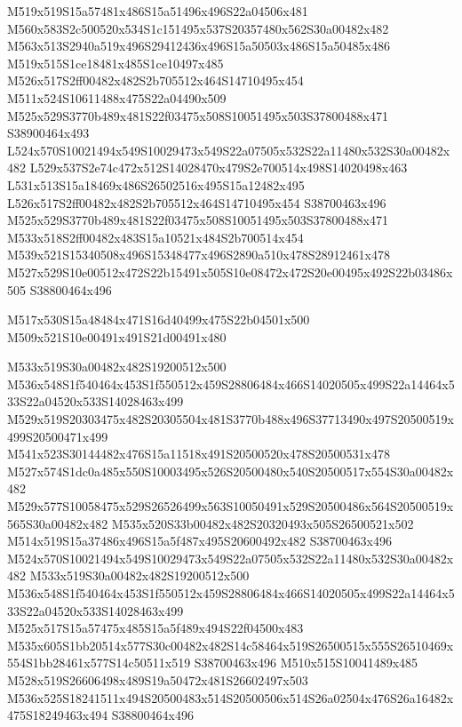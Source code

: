 \documentclass{article}
\begin{document}
\begin{multicols}{2}
M519x519S15a57481x486S15a51496x496S22a04506x481 M560x583S2c500520x534S1c151495x537S20357480x562S30a00482x482 M563x513S2940a519x496S29412436x496S15a50503x486S15a50485x486 M519x515S1ce18481x485S1ce10497x485 M526x517S2ff00482x482S2b705512x464S14710495x454 M511x524S10611488x475S22a04490x509 M525x529S3770b489x481S22f03475x508S10051495x503S37800488x471 S38900464x493 L524x570S10021494x549S10029473x549S22a07505x532S22a11480x532S30a00482x482 L529x537S2e74c472x512S14028470x479S2e700514x498S14020498x463 L531x513S15a18469x486S26502516x495S15a12482x495 L526x517S2ff00482x482S2b705512x464S14710495x454 S38700463x496 M525x529S3770b489x481S22f03475x508S10051495x503S37800488x471 M533x518S2ff00482x483S15a10521x484S2b700514x454 M539x521S15340508x496S15348477x496S2890a510x478S28912461x478 M527x529S10e00512x472S22b15491x505S10e08472x472S20e00495x492S22b03486x505 S38800464x496

\begin{center}
M517x530S15a48484x471S16d40499x475S22b04501x500 M509x521S10e00491x491S21d00491x480 
\end{center}


M533x519S30a00482x482S19200512x500 M536x548S1f540464x453S1f550512x459S28806484x466S14020505x499S22a14464x533S22a04520x533S14028463x499 M529x519S20303475x482S20305504x481S3770b488x496S37713490x497S20500519x499S20500471x499 M541x523S30144482x476S15a11518x491S20500520x478S20500531x478 M527x574S1dc0a485x550S10003495x526S20500480x540S20500517x554S30a00482x482 M529x577S10058475x529S26526499x563S10050491x529S20500486x564S20500519x565S30a00482x482 M535x520S33b00482x482S20320493x505S26500521x502 M514x519S15a37486x496S15a5f487x495S20600492x482 S38700463x496 M524x570S10021494x549S10029473x549S22a07505x532S22a11480x532S30a00482x482 M533x519S30a00482x482S19200512x500 M536x548S1f540464x453S1f550512x459S28806484x466S14020505x499S22a14464x533S22a04520x533S14028463x499 M525x517S15a57475x485S15a5f489x494S22f04500x483 M535x605S1bb20514x577S30c00482x482S14c58464x519S26500515x555S26510469x554S1bb28461x577S14c50511x519 S38700463x496 M510x515S10041489x485 M528x519S26606498x489S19a50472x481S26602497x503 M536x525S18241511x494S20500483x514S20500506x514S26a02504x476S26a16482x475S18249463x494 S38800464x496


\end{multicols}
\end{document}
